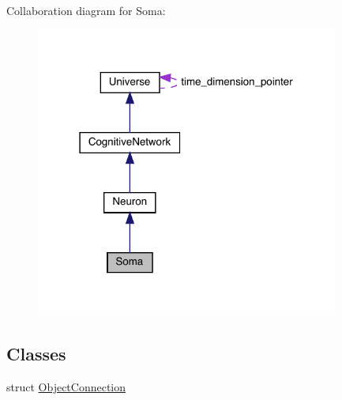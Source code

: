 Collaboration diagram for Soma\+:\nopagebreak
\begin{figure}[H]
\begin{center}
\leavevmode
\includegraphics[width=283pt]{class_soma__coll__graph}
\end{center}
\end{figure}
\subsection*{Classes}
\begin{DoxyCompactItemize}
\item 
struct \mbox{\hyperlink{struct_soma_1_1_object_connection}{Object\+Connection}}
\end{DoxyCompactItemize}
